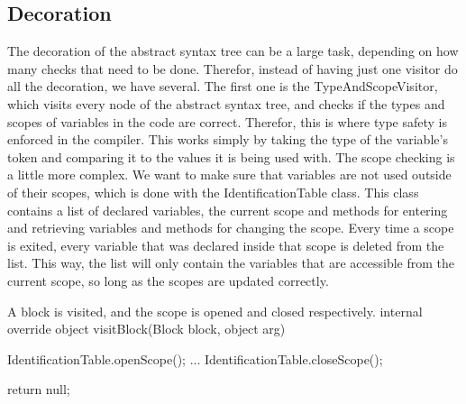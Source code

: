 \subsection{Decoration}
The decoration of the abstract syntax tree can be a large task, depending on how many checks that need to be done. 
Therefor, instead of having just one visitor do all the decoration, we have several. \newline
The first one is the TypeAndScopeVisitor, which visits every node of the abstract syntax tree, and checks if the types and scopes of variables in the code are correct.\newline
Therefor, this is where type safety is enforced in the compiler. 
This works simply by taking the type of the variable's token and comparing it to the values it is being used with. \newline
The scope checking is a little more complex. 
We want to make sure that variables are not used outside of their scopes, which is done with the IdentificationTable class. 
This class contains a list of declared variables, the current scope and methods for entering and retrieving variables and methods for changing the scope.\newline
Every time a scope is exited, every variable that was declared inside that scope is deleted from the list. 
This way, the list will only contain the variables that are accessible from the current scope, so long as the scopes are updated correctly.
\newline
\begin{source}{A block is visited, and the scope is opened and closed respectively.}{}
internal override object visitBlock(Block block, object arg)
		{
        IdentificationTable.openScope();
        ...
        IdentificationTable.closeScope();

        return null;
     }
\end{source}
\newline